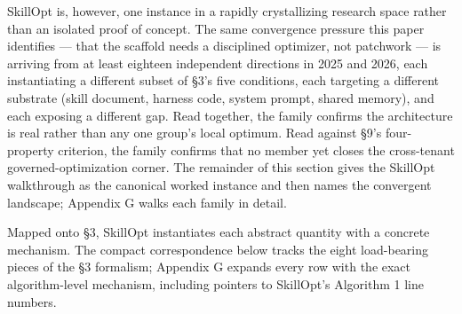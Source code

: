 \documentclass[
]{article}
\begin{document}
SkillOpt is, however, one instance in a rapidly crystallizing research
space rather than an isolated proof of concept. The same convergence
pressure this paper identifies --- that the scaffold needs a disciplined
optimizer, not patchwork --- is arriving from at least eighteen
independent directions in 2025 and 2026, each instantiating a different
subset of §3's five conditions, each targeting a different substrate
(skill document, harness code, system prompt, shared memory), and each
exposing a different gap. Read together, the family confirms the
architecture is real rather than any one group's local optimum. Read
against §9's four-property criterion, the family confirms that no member
yet closes the cross-tenant governed-optimization corner. The remainder
of this section gives the SkillOpt walkthrough as the canonical worked
instance and then names the convergent landscape; Appendix G walks each
family in detail.

Mapped onto §3, SkillOpt instantiates each abstract quantity with a
concrete mechanism. The compact correspondence below tracks the eight
load-bearing pieces of the §3 formalism; Appendix G expands every row
with the exact algorithm-level mechanism, including pointers to
SkillOpt's Algorithm 1 line numbers.
\end{document}
